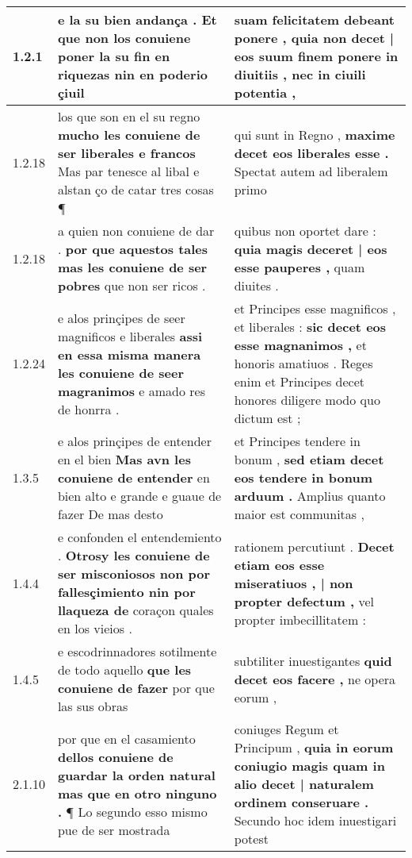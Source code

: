 \begin{tabular}{|p{1cm}|p{6.5cm}|p{6.5cm}|}

\hline
1.2.1 & e la su bien andança . \textbf{ Et que non los conuiene poner la su fin en riquezas } nin en poderio çiuil & suam felicitatem debeant ponere , \textbf{ quia non decet | eos suum finem ponere in diuitiis , } nec in ciuili potentia , \\\hline
1.2.18 & los que son en el su regno \textbf{ mucho les conuiene de ser liberales e francos } Mas par tenesce al libal e alstan ço de catar tres cosas ¶ & qui sunt in Regno , \textbf{ maxime decet eos liberales esse . } Spectat autem ad liberalem primo \\\hline
1.2.18 & a quien non conuiene de dar . \textbf{ por que aquestos tales mas les conuiene de ser pobres } que non ser ricos . & quibus non oportet dare : \textbf{ quia magis deceret | eos esse pauperes , } quam diuites . \\\hline
1.2.24 & e alos prinçipes de seer magnificos e liberales \textbf{ assi en essa misma manera les conuiene de seer magranimos } e amado res de honrra . & et Principes esse magnificos , et liberales : \textbf{ sic decet eos esse magnanimos , } et honoris amatiuos . Reges enim et Principes decet honores diligere modo quo dictum est ; \\\hline
1.3.5 & e alos prinçipes de entender en el bien \textbf{ Mas avn les conuiene de entender } en bien alto e grande e guaue de fazer De mas desto & et Principes tendere in bonum , \textbf{ sed etiam decet eos tendere in bonum arduum . } Amplius quanto maior est communitas , \\\hline
1.4.4 & e confonden el entendemiento . \textbf{ Otrosy les conuiene de ser misconiosos non por fallesçimiento nin por llaqueza de } coraçon quales en los vieios . & rationem percutiunt . \textbf{ Decet etiam eos esse miseratiuos , | non propter defectum , } vel propter imbecillitatem : \\\hline
1.4.5 & e escodrinnadores sotilmente de todo aquello \textbf{ que les conuiene de fazer } por que las sus obras & subtiliter inuestigantes \textbf{ quid decet eos facere , } ne opera eorum , \\\hline
2.1.10 & por que en el casamiento \textbf{ dellos conuiene de guardar la orden natural mas que en otro ninguno . } ¶ Lo segundo esso mismo pue de ser mostrada & coniuges Regum et Principum , \textbf{ quia in eorum coniugio magis quam in alio decet | naturalem ordinem conseruare . } Secundo hoc idem inuestigari potest \\\hline

\end{tabular}
